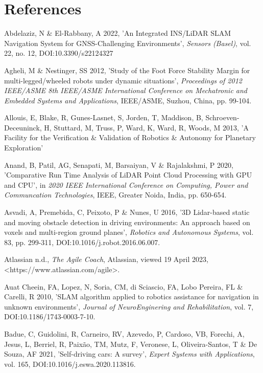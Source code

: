 \section*{References}
Abdelaziz, N \& El-Rabbany, A 2022, 'An Integrated INS/LiDAR SLAM Navigation System for GNSS-Challenging Environments', \textit{Sensors (Basel)}, vol. 22, no. 12, DOI:10.3390/s22124327

Agheli, M \& Nestinger, SS 2012, 'Study of the Foot Force Stability Margin for multi-legged/wheeled robots under dynamic situations', \textit{Proceedings of 2012 IEEE/ASME 8th IEEE/ASME International Conference on Mechatronic and Embedded Systems and Applications}, IEEE/ASME, Suzhou, China, pp. 99-104. 

Allouis, E, Blake, R, Gunes-Lasnet, S, Jorden, T, Maddison, B, Schroeven-Deceuninck, H, Stuttard, M, Truss, P, Ward, K, Ward, R, Woods, M 2013, 'A Facility for the Verification \& Validation of Robotics \& Autonomy for Planetary Exploration'

Anand, B, Patil, AG, Senapati, M, Barsaiyan, V \& Rajalakshmi, P 2020, 'Comparative Run Time Analysis of LiDAR Point Cloud Processing with GPU and CPU', in \textit{2020 IEEE International Conference on Computing, Power and Communcation Technologies}, IEEE, Greater Noida, India, pp. 650-654.

Asvadi, A, Premebida, C, Peixoto, P \& Nunes, U 2016, '3D Lidar-based static and moving obstacle detection in driving environments: An approach based on voxels and multi-region ground planes', \textit{Robotics and Autonomous Systems}, vol. 83, pp. 299-311, DOI:10.1016/j.robot.2016.06.007.

Atlassian n.d., \textit{The Agile Coach}, Atlassian, viewed 19 April 2023, \\ \textless https://www.atlassian.com/agile\textgreater.

Auat Cheein, FA, Lopez, N, Soria, CM, di Sciascio, FA, Lobo Pereira, FL \& Carelli, R 2010, 'SLAM algorithm applied to robotics assistance for navigation in unknown environments', \textit{Journal of NeuroEnginering and Rehabilitation}, vol. 7, DOI:10.1186/1743-0003-7-10.

Badue, C, Guidolini, R, Carneiro, RV, Azevedo, P, Cardoso, VB, Forechi, A, Jesus, L, Berriel, R, Paixão, TM, Mutz, F, Veronese, L, Oliveira-Santos, T \& De Souza, AF 2021, 'Self-driving cars: A survey', \textit{Expert Systems with Applications}, vol. 165, DOI:10.1016/j.eswa.2020.113816.

